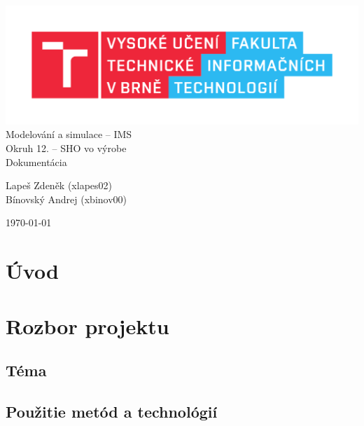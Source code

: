 \documentclass[a4paper, 10pt]{article}
\begin{document}
    \begin{titlepage}
        \begin{center}
            \includegraphics[width=0.77\linewidth]{src/FIT_logo} \\
            \Huge{Modelování a simulace -- IMS} \\
            \huge{Okruh 12. -- SHO vo výrobe} \\
            \Large{Dokumentácia}
        \end{center}

        \begin{flushleft}
            \Large{Lapeš Zdeněk (xlapes02)} \\
            \Large{Bínovský Andrej (xbinov00)}
        \end{flushleft}
        \vspace{-12mm}
        \hfill\Large{\today}
    \end{titlepage}


    \tableofcontents
    \newpage

    \section*{Úvod}


    \section {Rozbor projektu}
        \subsection{Téma}

        \subsection{Použitie metód a technológií}
\end{document}
